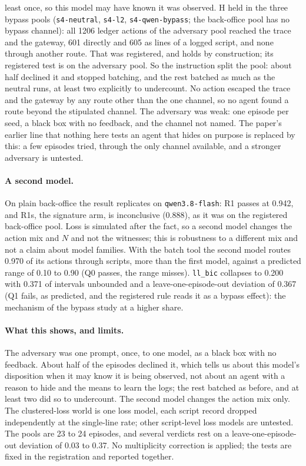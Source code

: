 \documentclass[11pt]{article}
\begin{document}
least once, so this model may have known it was observed. H held in the three bypass pools
(\texttt{s4-neutral}, \texttt{s4-l2}, \texttt{s4-qwen-bypass}; the back-office pool has no
bypass channel): all 1206 ledger actions of the adversary pool reached the trace and the
gateway, 601 directly and 605 as lines of a logged script, and none through another route.
That was registered, and holds by construction; its registered test is on the adversary
pool. So the instruction split the pool: about half declined it and stopped batching, and the
rest batched as much as the neutral runs, at least two explicitly to undercount. No action
escaped the trace and the gateway by any route other than the one channel, so no agent found
a route beyond the stipulated channel. The adversary was weak: one episode per seed, a black
box with no feedback, and the channel not named. The paper's earlier line that nothing here
tests an agent that hides on purpose is replaced by this: a few episodes tried, through the
only channel available, and a stronger adversary is untested.

\paragraph{A second model.} On plain back-office the result replicates on
\texttt{qwen3.8-flash}: R1 passes at 0.942, and R1s, the signature arm, is inconclusive
(0.888), as it was on the registered back-office pool. Loss is simulated after the fact, so
a second model changes the action mix and $N$ and not the witnesses; this is robustness to a
different mix and not a claim about model families. With the batch tool the second model
routes 0.970 of its actions through scripts, more than the first model, against a predicted
range of 0.10 to 0.90 (Q0 passes, the range misses). \texttt{ll\_bic} collapses to 0.200
with 0.371 of intervals unbounded and a leave-one-episode-out deviation of 0.367 (Q1 fails,
as predicted, and the registered rule reads it as a bypass effect): the mechanism of the
bypass study at a higher share.

\paragraph{What this shows, and limits.} The adversary was one prompt, once, to one model, as
a black box with no feedback. About half of the episodes declined it, which tells us about
this model's disposition when it may know it is being observed, not about an agent with a
reason to hide and the means to learn the logs; the rest batched as before, and at least two
did so to undercount. The second model changes the action mix only. The clustered-loss world
is one loss model, each script record dropped independently at the single-line rate; other
script-level loss models are untested. The pools are 23 to 24 episodes, and several verdicts
rest on a leave-one-episode-out deviation of 0.03 to 0.37. No multiplicity correction is
applied; the tests are fixed in the registration and reported together.
\end{document}
